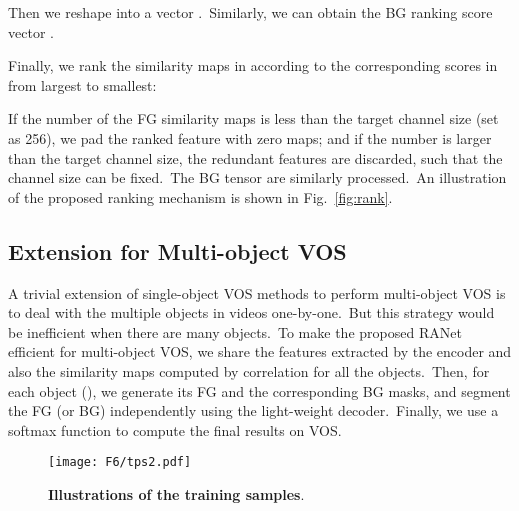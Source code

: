 \documentclass[10pt,twocolumn,letterpaper]{article}
\begin{document}
Then we reshape  into a vector .\ Similarly, we can obtain the BG ranking score vector . 

Finally, we rank the similarity maps in  according to the corresponding scores in  from largest to smallest:

If the number of the FG similarity maps  is less than the target channel size (set as 256), we pad the ranked feature with zero maps; and if the number is larger than the target channel size, the redundant features are discarded, such that the channel size can be fixed.\ The BG tensor  are similarly processed.\ An illustration of the proposed ranking mechanism is shown in Fig.~\ref{fig:rank}.\
 
 





\subsection{Extension for Multi-object VOS}
\label{sec:mifg}

A trivial extension of single-object VOS methods to perform multi-object VOS is to deal with the multiple objects in videos one-by-one.\ But this strategy would be inefficient when there are many objects.\ To make the proposed RANet efficient for multi-object VOS, we share the features extracted by the encoder and also the similarity maps  computed by correlation for all the  objects.\ Then, for each object  (), we generate its FG and the corresponding BG masks, and segment the FG (or BG) independently using the light-weight decoder.\ Finally, we use a softmax function to compute the final results on VOS.





\iffalse
\begin{figure}
\begin{center}
\texttt{[image: F6/filtermulti.pdf]}
\end{center}
\caption{our}
\label{fig:filter multi}
\end{figure}
\fi

\begin{figure}
\begin{center}
\texttt{[image: F6/tps2.pdf]}
\end{center}
\vspace{-7mm}
\caption{\textbf{Illustrations of the training samples}. }
\label{fig:tps}
\vspace{-6mm}
\end{figure}
\end{document}
